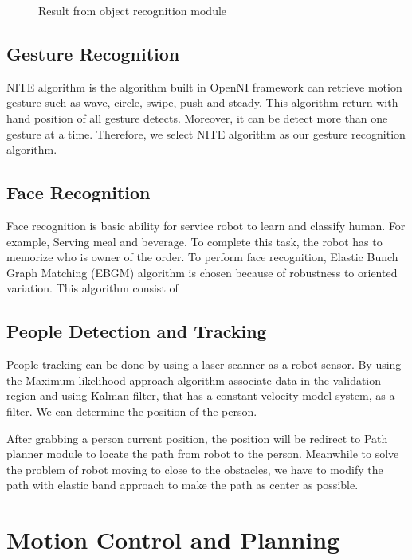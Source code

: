 \documentclass{llncs}
\begin{document}
\begin{figure}
\centering
\caption{Result from object recognition module}
\label{fig:object_recog}
\end{figure}

\subsection{Gesture Recognition}

NITE algorithm is the algorithm built in OpenNI framework can retrieve motion gesture such as wave, circle, swipe, push and steady. This algorithm return with hand position of all gesture detects.
Moreover, it can be detect more than one gesture at a time. Therefore, we select NITE algorithm as our
gesture recognition algorithm.

\subsection{Face Recognition}

Face recognition is basic ability for service robot to learn and classify human. For example, Serving meal and beverage. To complete this task, the robot has to memorize who is owner of the order. To perform face recognition, Elastic Bunch Graph Matching (EBGM) algorithm is chosen because of robustness to oriented variation. This algorithm consist of 

\subsection{People Detection and Tracking}

People tracking can be done by using a laser scanner as a robot sensor. By using the Maximum likelihood approach algorithm associate data in the validation region and using Kalman filter, that has a constant velocity model system, as a filter. We can determine the position of the person.

After grabbing a person current position, the position will be redirect to Path planner module to locate the path from robot to the person. Meanwhile to solve the problem of robot moving to close to the obstacles, we have to modify the path with elastic band approach to make the path as center as possible.

\section{Motion Control and Planning}
\end{document}
